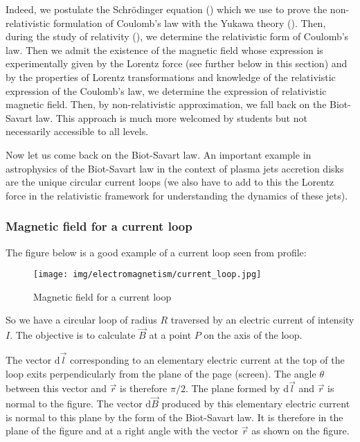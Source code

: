 	Indeed, we postulate the Schrödinger equation () which we use to prove the non-relativistic formulation of Coulomb's law with the Yukawa theory (). Then, during the study of relativity (), we determine the relativistic form of Coulomb's law. Then we admit the existence of the magnetic field whose expression is experimentally given by the Lorentz force (see further below in this section) and by the properties of Lorentz transformations and knowledge of the relativistic expression of the Coulomb's law, we determine the expression of relativistic magnetic field. Then, by non-relativistic approximation, we fall back on the Biot-Savart law. This approach is much more welcomed by students but not necessarily accessible to all levels.
	
	Now let us come back on the Biot-Savart law. An important example in astrophysics of the Biot-Savart law in the context of plasma jets accretion disks are the unique circular current loops (we also have to add to this the Lorentz force in the relativistic framework for understanding the dynamics of these jets).
	
	\subsubsection{Magnetic field for a current loop}
	The figure below is a good example of a current loop seen from profile:
	\begin{figure}[H]
		\centering
		\texttt{[image: img/electromagnetism/current\_loop.jpg]}
		\caption{Magnetic field for a current loop}
	\end{figure}
	So we have a circular loop of radius $R$ traversed by an electric current of intensity $I$. The objective is to calculate $\vec{B}$ at a point $P$ on the axis of the loop.
	
	The vector $\mathrm{d}\vec{l}$ corresponding to an elementary electric current at the top of the loop exits perpendicularly from the plane of the page (screen). The angle $\theta$ between this vector and $\vec{r}$ is therefore $\pi/2$. The plane formed by $\mathrm{d}\vec{l}$ and $\vec{r}$ is normal to the figure. The vector $\mathrm{d}\vec{B}$ produced by this elementary electric current is normal to this plane by the form of the Biot-Savart law. It is therefore in the plane of the figure and at a right angle with the vector $\vec{r}$ as shown on the figure.
	
